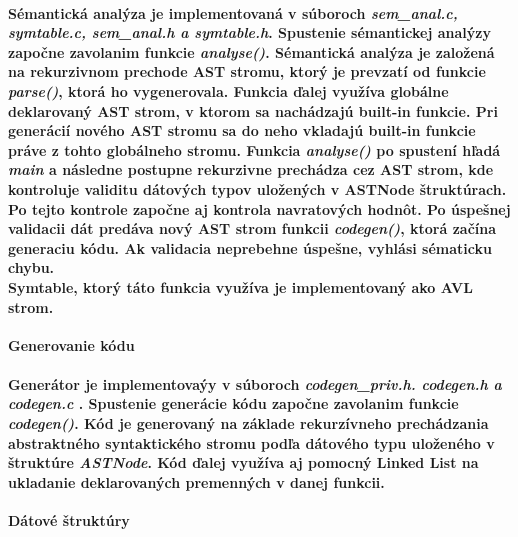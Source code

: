 \documentclass[12pt]{article}
\begin{document}
\paragraph{Sémantická analýza je implementovaná v súboroch \textit{sem\_anal.c, symtable.c, sem\_anal.h a symtable.h}. Spustenie sémantickej analýzy započne zavolanim funkcie \textit{analyse()}. Sémantická analýza je založená na rekurzivnom prechode AST stromu, ktorý je prevzatí od funkcie \textit{parse()}, ktorá ho vygenerovala. Funkcia ďalej využíva globálne deklarovaný AST strom, v ktorom sa nachádzajú built-in funkcie. Pri generácií nového AST stromu sa do neho vkladajú built-in funkcie práve z tohto globálneho stromu. Funkcia \textit{analyse()} po spustení hľadá \textit{main} a následne postupne rekurzivne prechádza cez AST strom, kde kontroluje validitu dátových typov uložených v ASTNode štruktúrach. Po tejto kontrole započne aj kontrola navratových hodnôt. Po úspešnej validacii dát predáva nový AST strom funkcii \textit{codegen()}, ktorá začína generaciu kódu. Ak validacia neprebehne úspešne, vyhlási sématicku chybu. \newline \\
Symtable, ktorý táto funkcia využíva je implementovaný ako AVL strom.  \newline \\}

 \Large \textbf{Generovanie kódu} \normalsize \\
\noindent\makebox[\linewidth]{\rule{\textwidth}{0.4pt}}

\paragraph{Generátor je implementovaýy v súboroch \textit{codegen\_priv.h. codegen.h a codegen.c }. Spustenie generácie kódu započne zavolanim funkcie \textit{codegen()}. Kód je generovaný na základe rekurzívneho prechádzania abstraktného syntaktického stromu podľa dátového typu uloženého v štruktúre \textit{ASTNode}. Kód ďalej využíva aj pomocný Linked List na ukladanie deklarovaných premenných v danej funkcii. \newline \\}


\newpage

 \Large \textbf{Dátové štruktúry}\normalsize \\
\noindent\makebox[\linewidth]{\rule{\textwidth}{0.4pt}}
\end{document}
